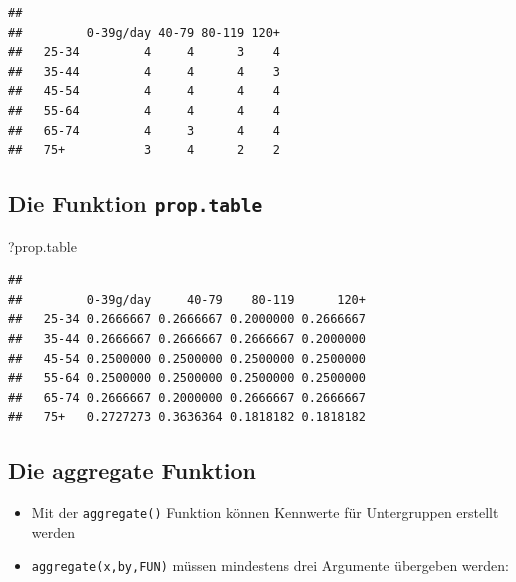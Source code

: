 \documentclass[]{article}
\newenvironment{Shaded}{\begin{snugshade}}{\end{snugshade}}
\newcommand{\KeywordTok}[1]{\textcolor[rgb]{0.13,0.29,0.53}{\textbf{{#1}}}}
\newcommand{\DecValTok}[1]{\textcolor[rgb]{0.00,0.00,0.81}{{#1}}}
\newcommand{\NormalTok}[1]{{#1}}
\providecommand{\tightlist}{%
  \setlength{\itemsep}{0pt}\setlength{\parskip}{0pt}}
\begin{document}
\begin{verbatim}
##        
##         0-39g/day 40-79 80-119 120+
##   25-34         4     4      3    4
##   35-44         4     4      4    3
##   45-54         4     4      4    4
##   55-64         4     4      4    4
##   65-74         4     3      4    4
##   75+           3     4      2    2
\end{verbatim}

\subsection{\texorpdfstring{Die Funktion
\texttt{prop.table}}{Die Funktion prop.table}}\label{die-funktion-prop.table}

\begin{Shaded}
\begin{Highlighting}[]
\NormalTok{?prop.table}
\end{Highlighting}
\end{Shaded}

\begin{Shaded}
\end{Shaded}

\begin{verbatim}
##        
##         0-39g/day     40-79    80-119      120+
##   25-34 0.2666667 0.2666667 0.2000000 0.2666667
##   35-44 0.2666667 0.2666667 0.2666667 0.2000000
##   45-54 0.2500000 0.2500000 0.2500000 0.2500000
##   55-64 0.2500000 0.2500000 0.2500000 0.2500000
##   65-74 0.2666667 0.2000000 0.2666667 0.2666667
##   75+   0.2727273 0.3636364 0.1818182 0.1818182
\end{verbatim}

\subsection{Die aggregate Funktion}\label{die-aggregate-funktion}

\begin{itemize}
\tightlist
\item
  Mit der \texttt{aggregate()} Funktion können Kennwerte für
  Untergruppen erstellt werden
\item
  \texttt{aggregate(x,by,FUN)} müssen mindestens drei Argumente
  übergeben werden:
\end{itemize}
\end{document}
